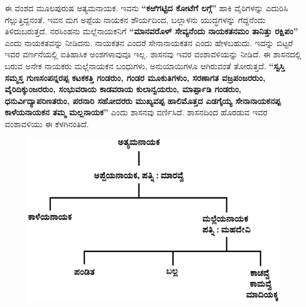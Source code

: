 ಈ ವಂಶದ ಮೂಲಪುರುಷ ಅತ್ಯಮನಾಯಕ. ಇವನು \textbf{“ಕಱಿಗಟ್ಟಿದ ಕೋಟೆಗೆ ಲಗ್ಗೆ”} ಹಾಕಿ ವೈರಿಗಳನ್ನು ಎದುರಿಸಿ ಗೆಲ್ಲುತ್ತಿದ್ದನಂತೆ. ಇವನ ಮಗ ಅಪ್ಪೆಯ ನಾಯಕನ ಶೌರ್ಯದಿಂದ, ಬಲ್ಲಾಳನು ಯುದ್ಧಗಳನ್ನು ಗೆದ್ದನೆಂದು ತಿಳಿದುಬರುತ್ತದೆ. ನರಸಿಂಹನು ಮಲ್ಲೆನಾಯಕನಿಗೆ \textbf{“ಮಾನವರೊಳ್​ ಸೇವ್ಯನೆಂದು ನಾಯಕತನಮಂ ತಾನಿತ್ತು ರಕ್ಷಿಪಂ”} ಎಂದು ನಾಯಕತವನ್ನು ನೀಡಿದನು. ನಾಯಕತನ ಎಂದರೆ ಸೇನಾನಾಯಕತನ ಎಂದು ಹೇಳಬಹುದು. ಇದನ್ನು ಬಿಟ್ಟರೆ ಇವರ ವರ್ಣನೆಯಲ್ಲಿ ಐತಿಹಾಸಿಕ ಅಂಶಗಳಾವುವೂ ಇಲ್ಲ. ಶಾಸನವು ಇವರ ವಂಶಾವಳಿಯನ್ನು ನೀಡಿದೆ. ಈ ಶಾಸನದಲ್ಲಿ ಬರುವ ಅನೇಕ ನಾಯಕರು ಮಲ್ಲೆನಾಯಕನ ಬಂಧುಗಳು, ಅನುಯಾಯಿಗಳೂ ಆಗಿರುವಂತೆ ತೋರುತ್ತದೆ. \textbf{“ಸ್ವಸ್ತಿ ಸಮ್ಮಸ್ತ ಗುಣಸಂಪನ್ನರಪ್ಪ ಕಟಕಕತ್ತಿ ಗಂಡರುಂ, ಗಂಡರ ಮೂಕುತಿಗಳುಂ, ಸರಣಾಗತ ವಜ್ರಪಂಜರರುಂ, ವೈರಿದಿಕ್ಕುಂಜರರುಂ, ಸಂಭುವರಾಯ ಕಾಡವರಾಯ ಕುಲಾನ್ವಯರುಂ, ಮಾರ್ಪ್ಪಾಡಿ ಗಂಡರುಂ, ಧನುರ್ವಿದ್ಯಾಪರಿಣತರುಂ, ಪರನಾರಿ ಸಹೋದರರು ಮುಖ್ಯವಪ್ಪ ಹಾಲಿಮೊತ್ತದ ಎಡಗೈಯ್ಯ ಸೇನಾನಾಯಕನಪ್ಪ ಕಾಳೆಯನಾಯಕನ ತಮ್ಮ ಮಲ್ಲನಾಯಕ”} ಎಂದು ಶಾಸನವು ವರ್ಣಿಸಿದೆ. ಶಾಸನದಿಂದ ಹೊರಡುವ ಇವರ ವಂಶಾವಳಿಯು ಈ ಕೆಳಗಿನಂತಿದೆ.

\begin{figure}[H]
\includegraphics[scale=1.2]{images/chap3/chap3fig29.jpeg}
\end{figure}

